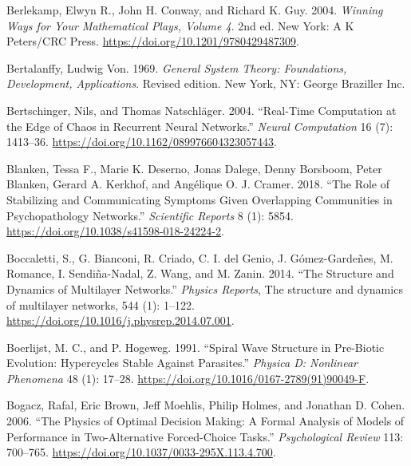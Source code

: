 \documentclass[
  a4paper,
  DIV=11,
  numbers=noendperiod]{scrreprt}
\newlength{\cslhangindent}
\newlength{\cslentryspacingunit} %
\newenvironment{CSLReferences}[2] %
 {%
  \setlength{\parindent}{0pt}
  \ifodd #1
  \let\oldpar\par
  \def\par{\hangindent=\cslhangindent\oldpar}
  \fi
  \setlength{\parskip}{#2\cslentryspacingunit}
 }%
 {}
\begin{document}
\begin{CSLReferences}{1}{0}
\leavevmode{}%
Berlekamp, Elwyn R., John H. Conway, and Richard K. Guy. 2004.
\emph{Winning {Ways} for {Your Mathematical Plays}, {Volume} 4}. 2nd ed.
{New York}: {A K Peters/CRC Press}.
\url{https://doi.org/10.1201/9780429487309}.

\leavevmode{}%
Bertalanffy, Ludwig Von. 1969. \emph{General {System Theory}:
{Foundations}, {Development}, {Applications}}. Revised edition. {New
York, NY}: {George Braziller Inc.}

\leavevmode{}%
Bertschinger, Nils, and Thomas Natschläger. 2004. {``Real-{Time
Computation} at the {Edge} of {Chaos} in {Recurrent Neural Networks}.''}
\emph{Neural Computation} 16 (7): 1413--36.
\url{https://doi.org/10.1162/089976604323057443}.

\leavevmode{}%
Blanken, Tessa F., Marie K. Deserno, Jonas Dalege, Denny Borsboom, Peter
Blanken, Gerard A. Kerkhof, and Angélique O. J. Cramer. 2018. {``The
Role of Stabilizing and Communicating Symptoms Given Overlapping
Communities in Psychopathology Networks.''} \emph{Scientific Reports} 8
(1): 5854. \url{https://doi.org/10.1038/s41598-018-24224-2}.

\leavevmode{}%
Boccaletti, S., G. Bianconi, R. Criado, C. I. del Genio, J.
Gómez-Gardeñes, M. Romance, I. Sendiña-Nadal, Z. Wang, and M. Zanin.
2014. {``The Structure and Dynamics of Multilayer Networks.''}
\emph{Physics Reports}, The structure and dynamics of multilayer
networks, 544 (1): 1--122.
\url{https://doi.org/10.1016/j.physrep.2014.07.001}.

\leavevmode{}%
Boerlijst, M. C., and P. Hogeweg. 1991. {``Spiral Wave Structure in
Pre-Biotic Evolution: {Hypercycles} Stable Against Parasites.''}
\emph{Physica D: Nonlinear Phenomena} 48 (1): 17--28.
\url{https://doi.org/10.1016/0167-2789(91)90049-F}.

\leavevmode{}%
Bogacz, Rafal, Eric Brown, Jeff Moehlis, Philip Holmes, and Jonathan D.
Cohen. 2006. {``The Physics of Optimal Decision Making: {A} Formal
Analysis of Models of Performance in Two-Alternative Forced-Choice
Tasks.''} \emph{Psychological Review} 113: 700--765.
\url{https://doi.org/10.1037/0033-295X.113.4.700}.


\end{CSLReferences}
\end{document}
